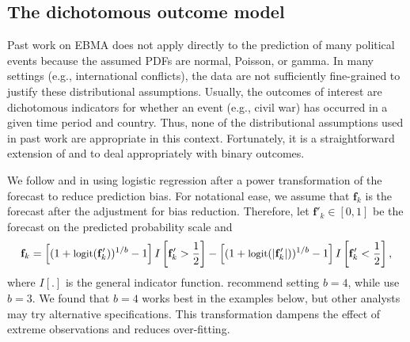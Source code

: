 \documentclass[pdftex,12pt,fullpage,oneside]{amsart}
\begin{document}
\subsection{The dichotomous outcome model}

Past work on EBMA does not apply directly to the prediction of many
political events because the assumed PDFs are normal, Poisson, or
gamma. In many settings (e.g., international conflicts), the data are
not sufficiently fine-grained to justify these distributional
assumptions.  Usually, the outcomes of interest are dichotomous
indicators for whether an event (e.g., civil war) has occurred in a
given time period and country. Thus, none of the distributional
assumptions used in past work are appropriate in this context.
Fortunately, it is a straightforward extension of
\citet{Sloughter:2007} and \citet{Sloughter:2010} to deal
appropriately with binary outcomes.


We follow \citet{Sloughter:2007} and \citet{Hamill:2004} in using
logistic regression after a power transformation of the forecast to
reduce prediction bias. For notational ease, we assume that $\mathbf{f}_k$ is the
forecast after the adjustment for bias reduction.  Therefore, let
$\mathbf{f}'_k \in [0,1]$ be the forecast on the predicted probability scale
 and
\begin{equation}
\small
\mathbf{f}_k =  \left[(1+\mbox{logit}(\mathbf{f}'_k))^{1/b} - 1\right]I\left[\mathbf{f}'_k>\frac{1}{2}\right]  - \left[(1+\mbox{logit}(|\mathbf{f}'_k|))^{1/b} -  1\right]I\left[\mathbf{f}'_k<\frac{1}{2}\right],
 \end{equation}
 \noindent where $I[.]$ is the general indicator function.
 \citet{Hamill:2004} recommend setting $b=4$, while
 \citet{Sloughter:2007} use $b=3$.  We found that $b=4$ works best in
 the examples below, but other analysts may try alternative
 specifications. This transformation dampens the effect of extreme observations and reduces over-fitting.
\end{document}
